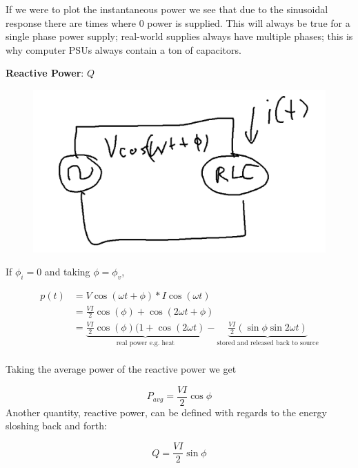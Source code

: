 \documentclass[10pt]{article}
\begin{document}
If we were to plot the instantaneous power we see that due to the sinusoidal response there are times where $ 0 $ power is supplied.
This will always be true for a single phase power supply; real-world supplies always have multiple phases; this is why computer PSUs always contain a ton of capacitors.


\begin{definition}
	\textbf{Reactive Power}: $ Q $ 


	\begin{figure}[H]
		\centering
		\includegraphics[width=0.8\linewidth]{img/image_2022-09-12-11-49-46.png}
	\end{figure}


	If $ \phi_i = 0$ and taking $ \phi = \phi_v $,

	\begin{equation}
		\begin{split}
			p(t) &= V\cos(\omega t + \phi) * I \cos(\omega t) \\
					 &= \frac{VI}{2} \cos(\phi) + \cos(2\omega t + \phi) \\
					 &= \underbrace{\frac{VI}{2} \cos(\phi)(1 + \cos(2 \omega t)}_{\text{real power e.g. heat}} 
					 - \underbrace{\frac{VI}{2} (\sin \phi \sin 2 \omega t)}_{\text{stored and released back to source}} \\
		\end{split}
	\end{equation}

	Taking the average power of the reactive power we get 

	\begin{equation}
		P_{avg} = \frac{VI}{2} \cos\phi
	\end{equation}
	Another quantity, reactive power, can be defined with regards to the energy sloshing back and forth:

	\begin{equation}
		Q = \frac{VI}{2} \sin \phi
		\label{eq:349:reactive_power_q}
	\end{equation}
	

\end{definition}
\end{document}

